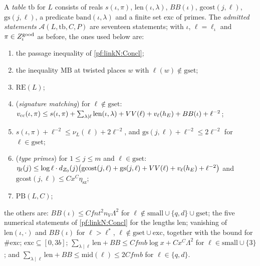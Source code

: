 \begin{definition}\label{pf:linkN:tab}
A \emph{table} $\mathrm{tb}$ for $L$ consists of reals $s(\iota,\pi)$, $\mathrm{len}(\iota,\lambda)$, $BB(\iota)$,
$\mathrm{gcost}(j,\ell)$, $\mathrm{gs}(j,\ell)$, a predicate $\mathrm{band}(\iota,\lambda)$ and a finite set $\mathrm{exc}$ of
primes. The \emph{admitted statements} $\mathcal A(L,\mathrm{tb},C,P)$ are seventeen statements; with $\iota$, $\ell=\ell_\iota$ and
$\pi\in Z^{\mathrm{good}}_\iota$ as before, the ones used below are:
\begin{enumerate}[label=(A\arabic*)]
\item\label{pf:linkN:A1} the passage inequality of \cref{pf:linkN:Concl};
\item\label{pf:linkN:A2} the inequality $\mathrm{MB}$ at twisted places $w$ with $\ell(w)\notin\mathrm{gset}$;
\item\label{pf:linkN:A3} $\mathrm{RE}(L)$;
\item\label{pf:linkN:A4} (\emph{signature matching}) for $\ell\notin\mathrm{gset}$:
$v_{\mathrm{cc}}(\iota,\pi)\le s(\iota,\pi)+\sum_{\lambda\mid\ell}\mathrm{len}(\iota,\lambda)+VV(\ell)+v_\ell(h_E)+BB(\iota)+\ell^{-2}$;
\item\label{pf:linkN:A5} $s(\iota,\pi)+\ell^{-2}\le\nu_L(\ell)+2\ell^{-2}$, and $\mathrm{gs}(j,\ell)+\ell^{-2}\le2\ell^{-2}$ for
$\ell\in\mathrm{gset}$;
\item\label{pf:linkN:A6} (\emph{type primes}) for $1\le j\le m$ and $\ell\in\mathrm{gset}$:
$\eta_\ell(j)\le\log\ell\cdot d_{Z_0}(j)\bigl(\mathrm{gcost}(j,\ell)+\mathrm{gs}(j,\ell)+VV(\ell)+v_\ell(h_E)+\ell^{-2}\bigr)$ and
$\mathrm{gcost}(j,\ell)\le Cx^C\eta_{\mathrm{sz}}$;
\item\label{pf:linkN:A7} $\mathrm{PB}(L,C)$;
\end{enumerate}
the others are: $BB(\iota)\le Cfnt^2n_V\Lambda^2$ for $\ell\notin\mathrm{small}\cup\{q,d\}\cup\mathrm{gset}$; the five numerical
statements of \cref{pf:linkN:Concl} for the lengths $\mathrm{len}$; vanishing of $\mathrm{len}(\iota,\cdot)$ and $BB(\iota)$ for $\ell>\ell^*$,
$\ell\notin\mathrm{gset}\cup\mathrm{exc}$, together with the bound for $\#\mathrm{exc}$; $\mathrm{exc}\subseteq[0,3b]$;
$\sum_{\lambda\mid\ell}\mathrm{len}+BB\le Cfmb\log x+Cx^C\Lambda^2$ for $\ell\in\mathrm{small}\cup\{3\}$; and
$\sum_{\lambda\mid\ell}\mathrm{len}+BB\le\mathrm{mid}(\ell)\le2Cfmb$ for $\ell\in\{q,d\}$.
\end{definition}

